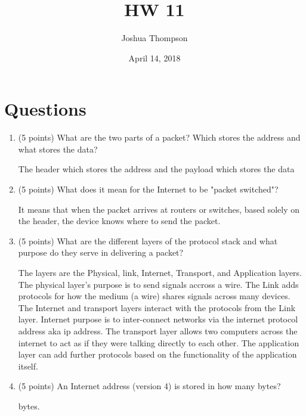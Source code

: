 \documentclass{article}[9pt]
\title{HW 11}
\author{Joshua Thompson}
\date{April 14, 2018}
\newenvironment{answerfont}{\fontfamily{qhv}\selectfont}{\par}
\newenvironment{myanswer}{\begin{mdframed}\begin{answerfont}}{\end{answerfont}\end{mdframed}}
\begin{document}
\maketitle
\section*{Questions}
\label{sec:org3ac93b9}

\begin{enumerate}
\item (5 points) What are the two parts of a packet? Which stores the address and what stores the data?

\begin{myanswer}
The header which stores the address and the payload which stores the data
\end{myanswer}


\item (5 points) What does it mean for the Internet to be "packet switched"?

  \begin{myanswer}
  It means that when the packet arrives at routers or switches, based solely on the header, the device knows where to send the packet.
  \end{myanswer}

\item (5 points) What are the different layers of the protocol stack and what purpose do they serve in delivering a packet?


  \begin{myanswer}
  The layers are the Physical, link, Internet, Transport, and Application layers. The physical layer's purpose is to send signals accross a wire. The Link adds protocols for how the medium (a wire) shares signals across many devices. The Internet and
  transport layers interact with the protocols from the Link layer. Internet purpose is to inter-connect networks via the internet protocol address aka ip address. The transport layer allows two computers across the internet to act as if they were talking
  directly to each other. The application layer can add further protocols based on the functionality of the application itself.
  \end{myanswer}

\item (5 points) An Internet address (version 4) is stored in how many bytes?

  \begin{myanswer}
  4 bytes.
  \end{myanswer}



\end{enumerate}
\end{document}
